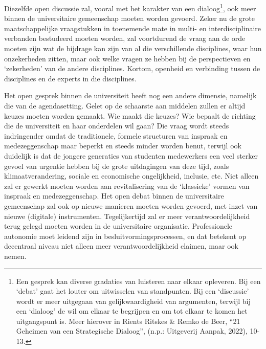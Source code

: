 \documentclass[empirical, authordate, ]{new-jote-article}
\begin{document}
	Diezelfde open discussie zal, vooral met het karakter van een dialoog\footnote{Een gesprek kan diverse gradaties van luisteren naar elkaar opleveren. Bij een ‘debat' gaat het louter om uitwisselen van standpunten. Bij een ‘discussie' wordt er meer uitgegaan van gelijkwaardigheid van argumenten, terwijl bij een ‘dialoog' de wil om elkaar te begrijpen en om tot elkaar te komen het uitgangspunt is. Meer hierover in Rients Ritskes \& Remko de Beer, “21 Geheimen van een Strategische Dialoog”, (n.p.: Uitgeverij Aanpak, 2022), 10-13.}, ook meer binnen de universitaire gemeenschap moeten worden gevoerd. Zeker nu de grote maatschappelijke vraagstukken in toenemende mate in multi- en interdisciplinaire verbanden bestudeerd moeten worden, zal voortdurend de vraag aan de orde moeten zijn wat de bijdrage kan zijn van al die verschillende disciplines, waar hun onzekerheden zitten, maar ook welke vragen ze hebben bij de perspectieven en ‘zekerheden' van de andere disciplines. Kortom, openheid en verbinding tussen de disciplines en de experts in die disciplines.



	Het open gesprek binnen de universiteit heeft nog een andere dimensie, namelijk die van de agendasetting. Gelet op de schaarste aan middelen zullen er altijd keuzes moeten worden gemaakt. Wie maakt die keuzes? Wie bepaalt de richting die de universiteit en haar onderdelen wil gaan? Die vraag wordt steeds indringender omdat de traditionele, formele structuren van inspraak en medezeggenschap maar beperkt en steeds minder worden benut, terwijl ook duidelijk is dat de jongere generaties van studenten medewerkers een veel sterker gevoel van urgentie hebben bij de grote uitdagingen van deze tijd, zoals klimaatverandering, sociale en economische ongelijkheid, inclusie, etc. Niet alleen zal er gewerkt moeten worden aan revitalisering van de ‘klassieke' vormen van inspraak en medezeggenschap. Het open debat binnen de universitaire gemeenschap zal ook op nieuwe manieren moeten worden gevoerd, met inzet van nieuwe (digitale) instrumenten. Tegelijkertijd zal er meer verantwoordelijkheid terug gelegd moeten worden in de universitaire organisatie. Professionele autonomie moet leidend zijn in besluitvormingsprocessen, en dat betekent op decentraal niveau niet alleen meer verantwoordelijkheid claimen, maar ook nemen.
\end{document}
